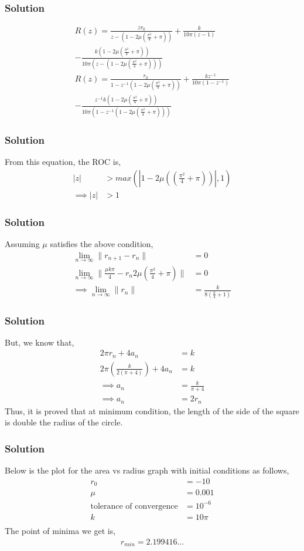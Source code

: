 \documentclass{beamer}
\providecommand{\brak}[1]{\ensuremath{\left(#1\right)}}
\theoremstyle{remark}
\providecommand{\abs}[1]{\left\vert#1\right\vert}
\providecommand{\norm}[1]{\lVert#1\rVert}
\numberwithin{equation}{section}
\begin{document}
		\begin{frame}
      \frametitle{Solution}

			\begin{multline}
	R\brak{z} = \frac{zr_0}{z - \brak{1 - 2\mu\brak{\frac{\pi^2}{4} + \pi}}} + \frac{k}{10 \pi \brak{z - 1}} \\- \frac{k \brak{1 - 2\mu\brak{\frac{\pi^2}{4} + \pi}}}{10 \pi \brak{z - \brak{1 - 2\mu\brak{\frac{\pi^2}{4} + \pi}}}}\\
	R\brak{z} = \frac{r_0}{1 - z^{-1}\brak{1 - 2\mu\brak{\frac{\pi^2}{4} + \pi}}} + \frac{kz^{-1}}{10 \pi \brak{1 - z^{-1}}} \\- \frac{z^{-1}k \brak{1 - 2\mu\brak{\frac{\pi^2}{4} + \pi}}}{10 \pi \brak{1 - z^{-1}\brak{1 - 2\mu\brak{\frac{\pi^2}{4} + \pi}}}}
			\end{multline}

		\end{frame}
		\begin{frame}
      \frametitle{Solution}
			From this equation, the ROC is,
\begin{align}
	\abs{z} &> max\brak{\abs{1 - 2\mu\brak{\brak{\frac{\pi^2}{4} + \pi}}},1}\\
	\implies \abs{z} &> 1	
\end{align}
		\end{frame}
		\begin{frame}
      \frametitle{Solution}
			Assuming $\mu$ satisfies the above condition,
\begin{align}
	\lim_{n\to\infty}\norm{r_{n+1} - r_n} &= 0\\
	\lim_{n\to\infty}\norm{\frac{\mu k\pi}{4} - r_n2\mu\brak{\frac{\pi^2}{4} + \pi}} &= 0\\
	\implies \lim_{n\to\infty}\norm{r_n} &= \frac{k}{8\brak{\frac{\pi}{4} + 1}}
\end{align}
		\end{frame}
		\begin{frame}
      \frametitle{Solution}
			But, we know that,
\begin{align}
	2\pi r_n + 4a_n &= k\\
	2\pi \brak{\frac{k}{2\brak{\pi + 4}}} + 4a_n &= k\\
	\implies a_n &= \frac{k}{\pi + 4}\\
	\implies a_n &= 2r_n
\end{align}
Thus, it is proved that at minimum condition, the length of the side of the square is double the radius of the circle.
		\end{frame}
		\begin{frame}
      \frametitle{Solution}
			Below is the plot for the area vs radius graph with initial conditions as follows,
\begin{align}
	r_0 &= -10\\
	\mu &= 0.001\\
	\text{tolerance of convergence} &= 10^{-6}\\
	k &= 10\pi\\
\end{align}
The point of minima we get is,
\begin{align}
	r_{min} = 2.199416...
\end{align}
\end{frame}
\end{document}
